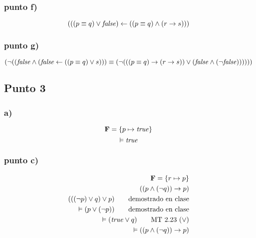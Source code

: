 \documentclass{article}
\newlength{\logicv}
\newenvironment{logicenv}[2][0]{
  \begin{tcolorbox}[demo, title = #2]
  \vspace*{#1\logicv}
}{
  \end{tcolorbox}
  \vspace*{-.5cm}
}
\begin{document}
\subsubsection{punto f)}

\begin{logicenv}{punto f)}
    $$(((p \equiv q) \lor \textrm{\textit{false}}) \gets ((p \equiv q) \land (r \to s)))$$
\end{logicenv}

\subsubsection{punto g)}

\begin{logicenv}{punto g)}
    $$(\neg((\textrm{\textit{false}} \land (\textrm{\textit{false}} \gets ((p \equiv q) \lor s))) \equiv (\neg(((p \equiv q) \to (r \to s)) \lor (\textrm{\textit{false}} \land (\neg \textrm{\textit{false}}))))))$$
\end{logicenv}

\subsection{Punto 3}

\subsubsection{a)}

\begin{logicenv}{punto a)}
    $$\mathbf{F} = \{p \mapsto \textrm{\textit{true}}\}$$
    $$\vDash \textrm{\textit{true}}$$
\end{logicenv}

\subsubsection{punto c)}

\begin{logicenv}{punto c)}
    \begin{alignat*}{1}
        \mathbf{F} = \{r \mapsto p\}\\
        ((p \land (\neg q)) \to p)\\
        (((\neg p) \lor q) \lor p) \tag*{demostrado en clase}\\
        \vDash (p \lor (\neg p)) \tag*{demostrado en clase}\\
        \vDash (\textrm{\textit{true}} \lor q) \tag*{MT 2.23 ($\lor$)}\\
        \vDash ((p \land (\neg q)) \to p)
    \end{alignat*}
\end{logicenv}
\end{document}
